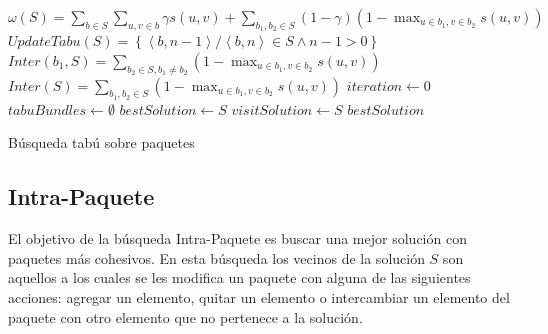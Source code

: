 \begin{center}
	\begin{algorithm}[H]
	\DontPrintSemicolon
	\SetAlgoLined
		$\omega(S) = \sum_{b \in S}{\sum_{u,v \in b}{\gamma s(u,v)}} + \sum_{b_1,b_2 \in S}{(1-\gamma) (1-\max_{u \in b_1, v \in b_2}{s(u,v)})}$\;
		$UpdateTabu(S) = \left\{ \left\langle b, n-1 \right\rangle  / \left\langle b, n \right\rangle \in S \wedge n-1 > 0 \right\}$\;
		$Inter(b_1, S) = \sum_{b_2 \in S, b_1\neq b_2}{(1-\max_{u \in b_1, v \in b_2}{s(u,v)})}$\;
		$Inter(S) = \sum_{b_1, b_2 \in S}{(1-\max_{u \in b_1, v \in b_2}{s(u,v)})}$\;
		$iteration \leftarrow 0$\;
		$tabuBundles \leftarrow \emptyset$\;
		$bestSolution \leftarrow S$\;
		$visitSolution \leftarrow S$\;
		\Return $bestSolution$\;
	\caption{Búsqueda tabú sobre paquetes}\label{alg:algBusTabuBundle}
	\end{algorithm}
\end{center}

\subsection{Intra-Paquete}
El objetivo de la búsqueda Intra-Paquete es buscar una mejor solución con paquetes más cohesivos. En esta búsqueda los vecinos de la solución $S$ son aquellos a los cuales se les modifica un paquete con alguna de las siguientes acciones: agregar un elemento, quitar un elemento o intercambiar un elemento del paquete con otro elemento que no pertenece a la solución. 


